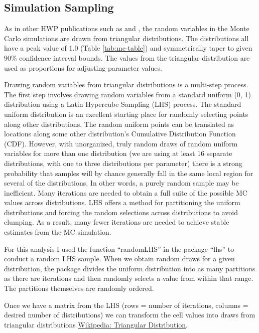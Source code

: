 \documentclass[
]{book}
\begin{document}
\hypertarget{model-mc-samp}{%
\subsection{Simulation Sampling}\label{model-mc-samp}}

As in other HWP publications such as \citet{stockmann2012} and \citet{anderson2013}, the random variables in the Monte Carlo simulations are drawn from triangular distributions. The distributions all have a peak value of 1.0 (Table \ref{tab:mc-table}) and symmetrically taper to given 90\% confidence interval bounds. The values from the triangular distribution are used as proportions for adjusting parameter values.

Drawing random variables from triangular distributions is a multi-step process. The first step involves drawing random variables from a standard uniform (0, 1) distribution using a Latin Hypercube Sampling (LHS) process. The standard uniform distribution is an excellent starting place for randomly selecting points along other distributions. The random uniform points can be translated as locations along some other distribution's Cumulative Distribution Function (CDF). However, with unorganized, truly random draws of random uniform variables for more than one distribution (we are using at least 16 separate distributions, with one to three distributions per parameter) there is a strong probability that samples will by chance generally fall in the same local region for several of the distributions. In other words, a purely random sample may be inefficient. Many iterations are needed to obtain a full suite of the possible MC values across distributions. LHS offers a method for partitioning the uniform distributions and forcing the random selections across distributions to avoid clumping. As a result, many fewer iterations are needed to achieve stable estimates from the MC simulation.

For this analysis I used the function ``randomLHS'' in the package ``lhs'' \citep{R-lhs} to conduct a random LHS sample. When we obtain random draws for a given distribution, the package divides the uniform distribution into as many partitions as there are iterations and then randomly selects a value from within that range. The partitions themselves are randomly ordered.

Once we have a matrix from the LHS (rows = number of iterations, columns = desired number of distributions) we can transform the cell values into draws from triangular distributions \href{https://en.wikipedia.org/wiki/Triangular_distribution}{Wikipedia: Triangular Distribution}.
\end{document}

